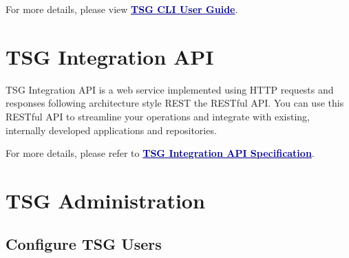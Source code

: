 For more details, please view \textcolor{darkblue}{\textbf{\underline{TSG CLI User Guide}}}.

\section*{\hypertarget{link:TSG Integration API}{TSG Integration API}}
\label{sec:intro:api}

TSG Integration API is a web service implemented using HTTP requests and responses following architecture style REST the RESTful API. 
You can use this RESTful API to streamline your operations and integrate with existing, internally developed applications and repositories. 


For more details, please refer to \textcolor{darkblue}{\textbf{\underline{TSG Integration API Specification}}}.


\section*{\hypertarget{link:TSG Administration}{TSG Administration}}
\label{sec:intro:admin}

\subsection*{\hypertarget{link:Configure TSG Users}{Configure TSG Users}}
\label{sec:intro:admin:users}


